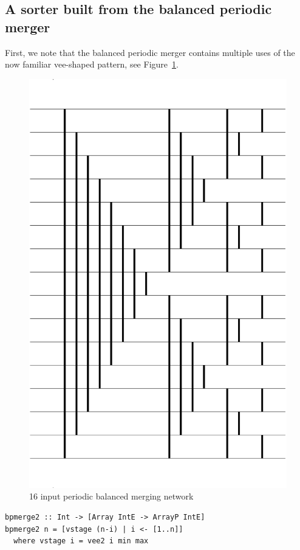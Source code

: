 \subsection{A sorter built from the balanced periodic merger}
First, we note that the balanced periodic merger contains multiple
uses of the now familiar vee-shaped pattern, see Figure~\ref{fig:periodicMerger}.
\begin{figure}
\centering
\includegraphics[scale=0.25]{./expressive/balanced}
\caption{16 input periodic balanced merging network}
\label{fig:periodicMerger}
\end{figure}

\begin{codesize}
\begin{verbatim}
bpmerge2 :: Int -> [Array IntE -> ArrayP IntE]
bpmerge2 n = [vstage (n-i) | i <- [1..n]]
  where vstage i = vee2 i min max
\end{verbatim}
\end{codesize}

